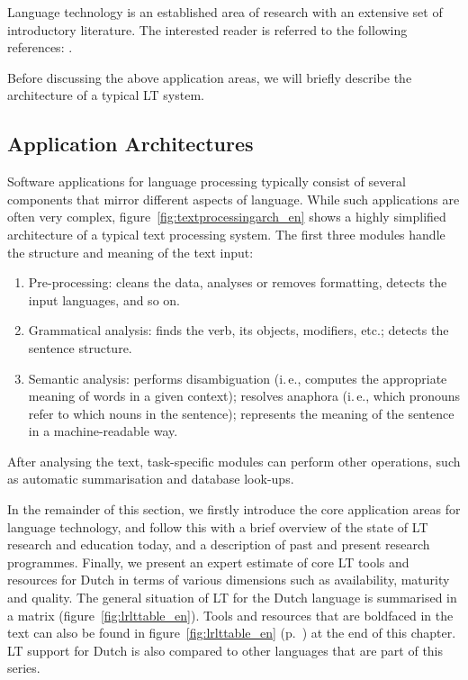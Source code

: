 \begin{multicols}{2}
Language technology is an established area of research with an extensive set of introductory literature. The interested reader is referred to the following references:  \cite{jurafsky-martin01, manning-schuetze1, lt-world1, lt-survey1}.

Before discussing the above application areas, we will briefly describe the architecture of a typical LT system.

\subsection{Application Architectures}

Software applications for language processing typically consist of several components that mirror different aspects of language. While such applications are often very complex, figure~\ref{fig:textprocessingarch_en} shows a highly simplified architecture of a typical text processing system. The first three modules handle the structure and meaning of the text input:

\begin{enumerate}
\item Pre-processing: cleans the data, analyses or removes formatting, detects the input languages, and so on.
\item Grammatical analysis: finds the verb, its objects, modifiers, etc.; detects the sentence structure.
\item Semantic analysis: performs disambiguation (i.\,e., computes the appropriate meaning of words in a given context); resolves anaphora (i.\,e., which pronouns refer to which nouns in the sentence); represents the meaning of the sentence in a machine-readable way.
\end{enumerate}

After analysing the text, task-specific modules can perform other operations, such as automatic summarisation and database look-ups.

In the remainder of this section, we firstly introduce the core application areas for language technology, and follow this with a brief overview of the state of LT research and education today, and a description of past and present research programmes. Finally, we present an expert estimate of core LT tools and resources for Dutch in terms of various dimensions such as availability, maturity and quality. The general situation of LT for the Dutch language is summarised in a matrix (figure~\ref{fig:lrlttable_en}). Tools and resources that are boldfaced in the text can also be found in figure~\ref{fig:lrlttable_en} (p.~\pageref{fig:lrlttable_en}) at the end of this chapter. LT support for Dutch is also compared to other languages that are part of this series.


\end{multicols}
